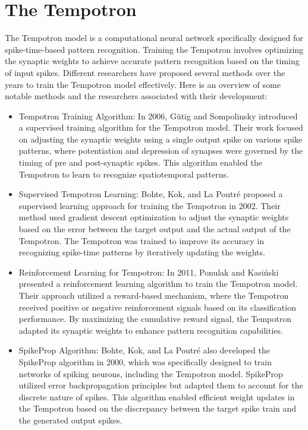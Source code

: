 \section{The Tempotron}

The Tempotron model is a computational neural network specifically designed for spike-time-based pattern recognition. Training the Tempotron involves optimizing the synaptic weights to achieve accurate pattern recognition based on the timing of input spikes. Different researchers have proposed several methods over the years to train the Tempotron model effectively. Here is an overview of some notable methods and the researchers associated with their development:
\begin{itemize}

    \item Tempotron Training Algorithm: In 2006, Gütig and Sompolinsky \cite{gutig2006tempotron} introduced a supervised training algorithm for the Tempotron model. Their work focused on adjusting the synaptic weights using a single output spike on various spike patterns, where potentiation and depression of synapses were governed by the timing of pre and post-synaptic spikes. This algorithm enabled the Tempotron to learn to recognize spatiotemporal patterns.
    
    \item 	Supervised Tempotron Learning: Bohte, Kok, and La Poutré \cite{bohte2002error} proposed a supervised learning approach for training the Tempotron in 2002. Their method used gradient descent optimization to adjust the synaptic weights based on the error between the target output and the actual output of the Tempotron. The Tempotron was trained to improve its accuracy in recognizing spike-time patterns by iteratively updating the weights.
    
    \item Reinforcement Learning for Tempotron: In 2011, Ponulak and Kasiński \cite{ponulak2011introduction} presented a reinforcement learning algorithm to train the Tempotron model. Their approach utilized a reward-based mechanism, where the Tempotron received positive or negative reinforcement signals based on its classification performance. By maximizing the cumulative reward signal, the Tempotron adapted its synaptic weights to enhance pattern recognition capabilities.
    
    \item SpikeProp Algorithm: Bohte, Kok, and La Poutré \cite{bohte2002error} also developed the SpikeProp algorithm in 2000, which was specifically designed to train networks of spiking neurons, including the Tempotron model. SpikeProp utilized error backpropagation principles but adapted them to account for the discrete nature of spikes. This algorithm enabled efficient weight updates in the Tempotron based on the discrepancy between the target spike train and the generated output spikes.
    

\end{itemize}
